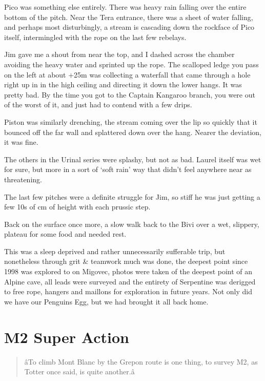 Pico was something else entirely. There was heavy rain falling over the
entire bottom of the pitch. Near the Tera entrance, there was a sheet of
water falling, and perhaps most disturbingly, a stream is cascading down
the rockface of Pico itself, intermingled with the rope on the last few
rebelays.

Jim gave me a shout from near the top, and I dashed across the chamber
avoiding the heavy water and sprinted up the rope. The scalloped ledge
you pass on the left at about +25m was collecting a waterfall that came
through a hole right up in in the high ceiling and directing it down the
lower hangs. It was pretty bad. By the time you got to the Captain
Kangaroo branch, you were out of the worst of it, and just had to
contend with a few drips.

Piston was similarly drenching, the stream coming over the lip so
quickly that it bounced off the far wall and splattered down over the
hang. Nearer the deviation, it was fine.

The others in the Urinal series were splashy, but not as bad. Laurel
itself was wet for sure, but more in a sort of `soft rain' way that
didn't feel anywhere near as threatening.

The last few pitches were a definite struggle for Jim, so stiff he was
just getting a few 10s of cm of height with each prussic step.

Back on the surface once more, a slow walk back to the Bivi over a wet,
slippery, plateau for some food and needed rest.

This was a sleep deprived and rather unnecessarily sufferable trip, but
nonetheless through grit \& teamwork much was done, the deepest point
since 1998 was explored to on Migovec, photos were taken of the deepest
point of an Alpine cave, all leads were surveyed and the entirety of
Serpentine was derigged to free rope, hangers and maillons for
exploration in future years. Not only did we have our Penguins Egg, but
we had brought it all back home.


\hypertarget{m2-super-action}{%
\section{M2 Super Action}\label{m2-super-action}}

\begin{verse}
âTo climb Mont Blanc by the Grepon route is one thing, to survey M2, as Totter once said, is quite another.â
\end{verse}

